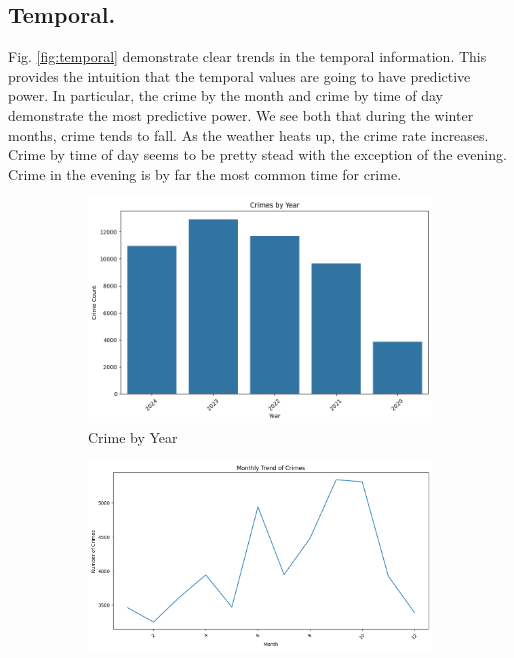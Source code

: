 \documentclass{article}
\begin{document}
\subsection{Temporal.} Fig. \ref{fig:temporal} demonstrate clear trends in the temporal information. This provides the intuition that the temporal values are going to have predictive power. In particular, the crime by the month and crime by time of day demonstrate the most predictive power. We see both that during the winter months, crime tends to fall. As the weather heats up, the crime rate increases. Crime by time of day seems to be pretty stead with the exception of the evening. Crime in the evening is by far the most common time for crime.

\begin{figure}
     \centering
     \begin{subfigure}[b]{0.3\textwidth}
         \centering
         \includegraphics[width=\textwidth]{deep-learning-im/crime-year.png}
         \caption{Crime by Year}
         \label{fig:crime-community}
     \end{subfigure}
     \hfill
     \begin{subfigure}[b]{0.3\textwidth}
         \centering
         \includegraphics[width=\textwidth]{deep-learning-im/crime-month.png}

\end{subfigure}
\end{figure}
\end{document}
